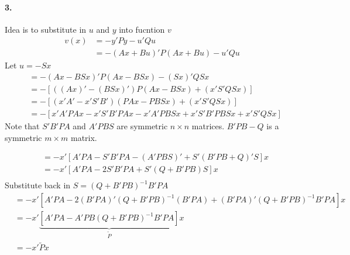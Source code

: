 \documentclass[10pt,letter]{article}
\begin{document}
\paragraph{3.}
Idea is to substitute in $u$ and $y$ into fucntion $v$
\begin{align}
  v(x) & = -y' P y - u' Q u \\
  & = -(A x + B u)' P (A x + B u) - u' Q u
\end{align}
Let $u = - S x$
\begin{align}
  & = -(A x - B S x)' P (A x - B S x) - (S x )' Q S x \\
  & = - \left[ ((A x)' - (B S x)')P(A x - B S x) + (x' S' Q S x) \right] \\
  & = - \left[ (x' A' - x' S' B') (P A x - P B S x) + (x' S' Q S x) \right] \\
  & = - \left[ x' A' P A x - x' S' B' P A x - x' A' P B S x + x' S' B' P B S x +  x' S' Q S x \right]
\end{align}
Note that $S' B' P A$ and $A' P B S$ are symmetric $n \times n$ matrices. $B' P B - Q$ is a symmetric $m \times m$ matrix.

\begin{align}
  & = - x' \left[ A' P A - S' B' P A - (A' P B S)' + S' (B' P B  +  Q)' S \right] x \\
  & = - x' \left[ A' P A - 2 S' B' P A + S' ( Q + B' P B) S \right] x \\
\end{align}
Substitute back in $S = (Q + B' P B)^{-1} B' P A$
\begin{align}
  & = - x' \left[ A' P A - 2 (B' P A)'(Q + B' P B)^{-1}( B' P A) + (B' P A)' (Q + B' P B)^{-1} B' P A \right] x \\
  & = - x' \underbrace{\left[ A' P A - A' P B (Q + B' P B)^{-1} B' P A \right]}_\text{$\tilde P$} x \\
  & = - x' \tilde P x
\end{align}
\end{document}
